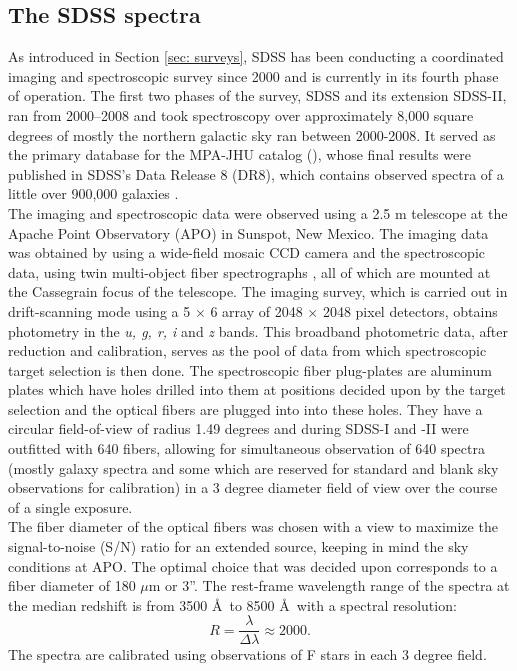 \subsection{The SDSS spectra}
\label{sdss spectra}

As introduced in Section \ref{sec: surveys}, SDSS has been conducting a coordinated imaging and spectroscopic survey since 2000 and is currently in its fourth phase of operation. The first two phases of the survey, SDSS and its extension SDSS-II, ran from 2000--2008 and took spectroscopy over approximately 8,000 square degrees of mostly the northern galactic sky 
ran between 2000-2008. It served as the primary database for the MPA-JHU catalog (\citealt{brinchmann_physical_2004, kauffmann_stellar_2003, tremonti_origin_2004}), whose final results were published in SDSS's Data Release 8 (DR8), 
which contains observed spectra of a little over 900,000 galaxies \citep{aihara11a}.\\

The imaging and spectroscopic data were observed using a 2.5 m telescope at the Apache Point Observatory (APO) in Sunspot, New Mexico. The imaging data was obtained by using a wide-field mosaic CCD camera and the spectroscopic data, using twin multi-object fiber spectrographs  \citep{smee_multi-object_2013}, all of which are mounted at the Cassegrain focus of the telescope. The imaging survey, which is carried out in drift-scanning mode using a 5 $\times$ 6 array of 2048 $\times$ 2048 pixel detectors, obtains photometry in the \emph{u, g, r, i} and \emph{z} bands. This broadband photometric data, after reduction and calibration, serves as the pool of data from which spectroscopic target selection is then done. The spectroscopic fiber plug-plates are aluminum plates which have holes drilled into them at positions decided upon by the target selection and the optical fibers are plugged into into these holes. They have a circular field-of-view of radius 1.49 degrees and during SDSS-I and -II were outfitted with 640 fibers, allowing for simultaneous observation of 640 spectra (mostly galaxy spectra and some which are reserved for standard and blank sky observations for calibration) in a 3 degree diameter field of view over the course of a single exposure.\\

The fiber diameter of the optical fibers was chosen with a view to maximize the signal-to-noise (S/N) ratio for an extended source, keeping in mind the sky conditions at APO. The optimal choice that was decided upon corresponds to a fiber diameter of 180 $\mu$m or 3''. The rest-frame wavelength range of the spectra at the median redshift is from 3500 \AA\ to 8500 \AA\ with a spectral resolution:\\ $$R = \frac{\lambda}{\Delta\lambda} \approx 2000.$$ The spectra are calibrated using observations of F stars in each 3 degree field.\\

